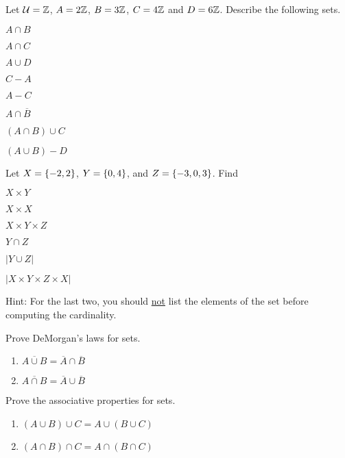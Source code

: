 \documentclass[12pt]{article}
\begin{document}
\begin{qu}
Let $\mathcal{U} = \mathbb Z$,  $A=2\mathbb Z$, $B=3\mathbb Z$, $C=4\mathbb Z$ and $D=6\mathbb Z$.
Describe the following sets.

\begin{inparaenum}[a)]
\item $A \cap B$
\tab \item $A \cap C$
\tab \item $A \cup D$
\tab \item $C-A$
\tab \item $A-C$
\tab \item $A\cap \overline{B}$
\tab \item $(A\cap B)\cup C $
\tab \item $(A \cup B)-D$
\end{inparaenum}
\end{qu}

\begin{qu}
Let $X=\left\{-2, 2\right\}$, $Y=\left\{0, 4\right\}$, and $Z=\left\{-3, 0, 3\right\}$.
Find

\begin{inparaenum}[a)]
\item $X \times Y$ 
\tab \item $X \times X$
\tab \item $X \times Y \times Z$
\tab \item $Y \cap Z$
\tab \item $|Y\cup Z|$
\tab \item $|X \times Y \times Z \times X|$
\end{inparaenum}

Hint: For the last two, you should \underline{not} list the elements of the set before computing the cardinality.

\end{qu}

\begin{qu} 
Prove DeMorgan's laws for sets.
\begin{enumerate}[label=\alph*)]
\item $ \overline{A\cup B} = \overline{A} \cap \overline{B}$
\item $\overline{A \cap B} = \overline{A} \cup \overline{B}$
\end{enumerate}
\end{qu}


\begin{qu} 
Prove the associative properties for sets.
\begin{enumerate}[label=\alph*)]
\item $ (A\cup B)\cup C = A \cup (B \cup C)$
\item $(A \cap B) \cap C = A \cap (B \cap C)$
\end{enumerate}
\end{qu}
\end{document}
